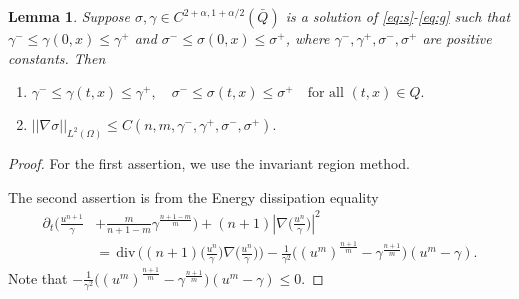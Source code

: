 \documentclass[a4paper,11pt]{article}
\def\blue{\color{blue}}
\def\div{\,\textrm{div}\,}
\newtheorem{lemma}{Lemma}[section]
\theoremstyle{remark}
\begin{document}
\begin{lemma}
Suppose $\sigma,\gamma\in C^{2+\alpha,1+\alpha/2}(\bar{Q})$ is a solution of \eqref{eq:s}-\eqref{eq:g} such that $\gamma^- \le \gamma(0,x) \le \gamma^+$ and $\sigma^- \le \sigma(0,x) \le \sigma^+$, where $\gamma^-,\gamma^+,\sigma^-,\sigma^+$ are positive constants. Then 
\begin{enumerate}
 \item $\gamma^- \le \gamma(t,x) \le \gamma^+, \quad \sigma^- \le \sigma(t,x) \le \sigma^+ \quad \text{for all $(t,x)\in Q$}.$
 \item $||\nabla\sigma||_{L^2(\Omega)} \le C(n,m,\gamma^-,\gamma^+,\sigma^-,\sigma^+).$
\end{enumerate}
\end{lemma}
\begin{proof}
 {\blue For the first assertion, we use the invariant region method.}
 
 The second assertion is from the Energy dissipation equality
\begin{align}
 \partial_t\Big( \frac{u^{n+1}}{\gamma} &+ \frac{m}{n+1-m}\gamma^{\frac{n+1-m}{m}}\Big) + (n+1) \left|\nabla \big(\frac{u^n}{\gamma}\big)\right|^2 \nonumber \\
 &= \div \Big( (n+1)\big(\frac{u^n}{\gamma}\big)\nabla \big(\frac{u^n}{\gamma}\big)\Big) - \frac{1}{\gamma^2}\Big( (u^m)^{\frac{n+1}{m}} - \gamma^{\frac{n+1}{m}}\Big)(u^m-\gamma). \label{eq:energy}
\end{align}
Note that $\displaystyle - \frac{1}{\gamma^2}\Big( (u^m)^{\frac{n+1}{m}} - \gamma^{\frac{n+1}{m}}\Big)(u^m-\gamma)\le0$. %
\end{proof}
\end{document}
